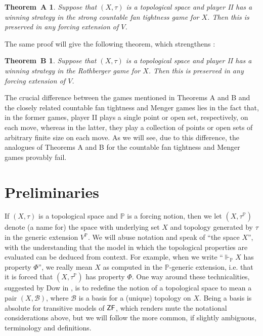\documentclass{amsart}
\newtheorem*{thma}{Theorem~A}
\newtheorem*{thmb}{Theorem~B}
\theoremstyle{definition}
\newcommand{\bb}{\mathbb}
\renewcommand{\P}{\bb{P}}
\newcommand{\ZF}{\sf ZF}
\begin{document}
\begin{thma}
Suppose that $(X, \tau)$ is a topological space and player II has a winning strategy in the strong countable fan tightness game for $X$. Then this is preserved in any forcing extension of $V$.
\end{thma}

The same proof will give the following theorem, which strengthens \cite[Theorem 7.2]{giltonPreservationTopologicalProperties2025}:

\begin{thmb}
Suppose that $(X, \tau)$ is a topological space and player II has a winning strategy in the Rothberger game for $X$. Then this is preserved in any forcing extension of $V$.
\end{thmb}

The crucial difference between the games mentioned in Theorems A and B and the closely related 
countable fan tightness and Menger games lies in the fact that, in the former games, player II 
plays a single point or open set, respectively, on each move, whereas in the latter, they play 
a collection of points or open sets of arbitrary finite size on each move. As we will see, due 
to this difference, the analogues of Theorems A and B for the countable fan tightness and Menger 
games provably fail.

\section{Preliminaries}

If $(X,\tau)$ is a topological space and $\P$ is a forcing notion, then we let $(X,\tau^\P)$ denote (a name for) the space with underlying set $X$ and topology generated by $\tau$ in the generic extension $V^\P$. We will abuse notation and speak of ``the space $X$'', with the understanding that the model in which the topological properties are evaluated can be deduced from context. For example, when we write ``$\Vdash_\P X$ has property $\Phi$'', we really mean $X$ as computed in the $\P$-generic extension, i.e. that it is forced that $(X,\tau^\P)$ has property $\Phi$. One way around these technicalities, suggested by Dow in \cite{dowTwoApplicationsReflection1988}, is to redefine the notion of a topological space to mean a pair $(X,\mathcal{B})$, where $\mathcal{B}$ is a basis for a (unique) topology on $X$. Being a basis is absolute for transitive models of $\ZF$, which renders mute the notational considerations above, but we will follow the more common, if slightly ambiguous, terminology and definitions.
\end{document}
